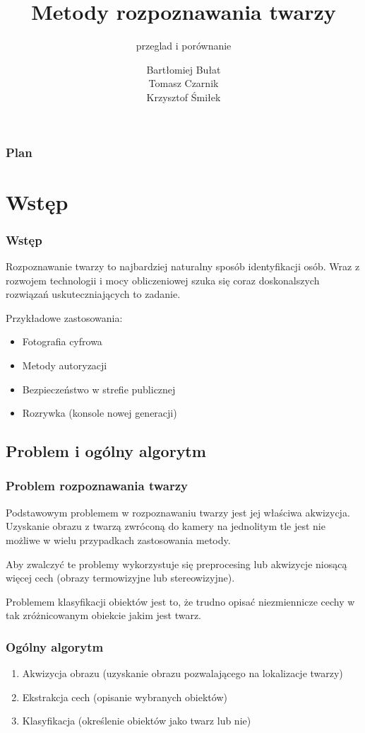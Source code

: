 \documentclass[xcolor=table]{beamer}
\title{Metody rozpoznawania twarzy}
\subtitle{przeglad i porównanie}
\author{Bartłomiej Bułat\\
Tomasz Czarnik\\
Krzysztof Śmiłek\\}
\begin{document}
\begin{frame}
  \titlepage
\end{frame}


\begin{frame}
  \frametitle{Plan}
  \tableofcontents
\end{frame}


\section{Wstęp}

\begin{frame}
  \frametitle{Wstęp}
  Rozpoznawanie twarzy to najbardziej naturalny sposób identyfikacji osób. Wraz z rozwojem technologii i mocy obliczeniowej szuka się coraz doskonalszych rozwiązań uskuteczniających to zadanie.\\[\baselineskip]
 {Przykładowe zastosowania:
\begin{itemize}
\item Fotografia cyfrowa
\item Metody autoryzacji
\item Bezpieczeństwo w strefie publicznej
\item Rozrywka (konsole nowej generacji)
\end{itemize}}
\end{frame}

\subsection{Problem i ogólny algorytm}
\begin{frame}
\frametitle{Problem rozpoznawania twarzy}

Podstawowym problemem w rozpoznawaniu twarzy jest jej właściwa akwizycja. Uzyskanie obrazu z twarzą zwróconą do kamery na jednolitym tle jest nie możliwe w wielu przypadkach zastosowania metody.
\pause

Aby zwalczyć te problemy wykorzystuje się preprocesing lub akwizycje niosącą więcej cech (obrazy termowizyjne lub stereowizyjne).
\pause

Problemem klasyfikacji obiektów jest to, że trudno opisać niezmiennicze cechy w tak zróżnicowanym obiekcie jakim jest twarz.   

\end{frame}


\begin{frame}
  \frametitle{Ogólny algorytm}

\begin{enumerate}
\item Akwizycja obrazu (uzyskanie obrazu pozwalającego na lokalizacje twarzy) \pause
\item Ekstrakcja cech (opisanie wybranych obiektów) \pause
\item Klasyfikacja (określenie obiektów jako twarz lub nie)
\end{enumerate}
   
\end{frame}
\end{document}
